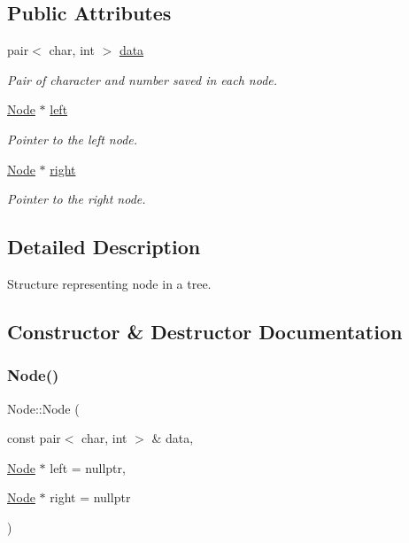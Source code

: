 \subsection*{Public Attributes}
\begin{DoxyCompactItemize}
\item 
pair$<$ char, int $>$ \mbox{\hyperlink{struct_node_aaa1c70b22c4bea8ee8d05294b244c9c5}{data}}
\begin{DoxyCompactList}\small\item\em Pair of character and number saved in each node. \end{DoxyCompactList}\item 
\mbox{\label{struct_node_ab8c667ac8fdb120ed4c031682a9cdaee}} 
\mbox{\hyperlink{struct_node}{Node}} $\ast$ \mbox{\hyperlink{struct_node_ab8c667ac8fdb120ed4c031682a9cdaee}{left}}
\begin{DoxyCompactList}\small\item\em Pointer to the left node. \end{DoxyCompactList}\item 
\mbox{\label{struct_node_a7328862eaa6dea28018326549b3294d3}} 
\mbox{\hyperlink{struct_node}{Node}} $\ast$ \mbox{\hyperlink{struct_node_a7328862eaa6dea28018326549b3294d3}{right}}
\begin{DoxyCompactList}\small\item\em Pointer to the right node. \end{DoxyCompactList}\end{DoxyCompactItemize}


\subsection{Detailed Description}
Structure representing node in a tree. 

\subsection{Constructor \& Destructor Documentation}
\mbox{\label{struct_node_aa039ff01cadc09c47e6e29ded1909172}} 
\subsubsection{\texorpdfstring{Node()}{Node()}}
{\footnotesize\ttfamily Node\+::\+Node (\begin{DoxyParamCaption}\item[{const pair$<$ char, int $>$ \&}]{data,  }\item[{\mbox{\hyperlink{struct_node}{Node}} $\ast$}]{left = {\ttfamily nullptr},  }\item[{\mbox{\hyperlink{struct_node}{Node}} $\ast$}]{right = {\ttfamily nullptr} }\end{DoxyParamCaption})\hspace{0.3cm}{\ttfamily [inline]}}



